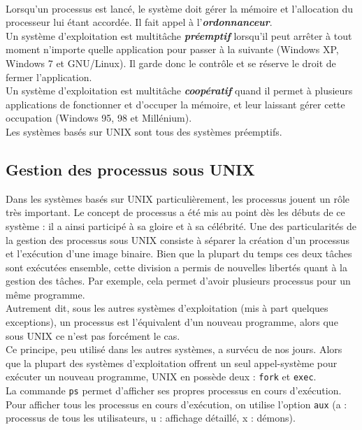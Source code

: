 		\paragraph{}
		Lorsqu'un processus est lancé, le système doit gérer la mémoire et l'allocation du processeur lui étant accordée. Il fait appel à l'\textit{\textbf{ordonnanceur}}.\\
		Un système d'exploitation est multitâche \textbf{\textit{préemptif}} lorsqu'il peut arrêter à tout moment n'importe quelle application pour passer à la suivante (Windows XP, Windows 7 et GNU/Linux). Il garde donc le contrôle et se réserve le droit de fermer l'application.\\
		Un système d'exploitation est multitâche \textbf{\textit{coopératif}} quand il permet à plusieurs applications de fonctionner et d'occuper la mémoire, et leur laissant gérer cette occupation (Windows 95, 98 et Millénium).\\
		Les systèmes basés sur UNIX sont tous des systèmes préemptifs.
		
	\subsection{Gestion des processus sous UNIX}
		Dans les systèmes basés sur UNIX particulièrement, les processus jouent un rôle très important. Le concept de processus a été mis au point dès les débuts de ce système : il a ainsi participé à sa gloire et à sa célébrité. Une des particularités de la gestion des processus sous UNIX consiste à séparer la création d'un processus et l'exécution d'une image binaire. Bien que la plupart du temps ces deux tâches sont exécutées ensemble, cette division a permis de nouvelles libertés quant à la gestion des tâches. Par exemple, cela permet d'avoir plusieurs processus pour un même programme.\\
		
		Autrement dit, sous les autres systèmes d'exploitation (mis à part quelques exceptions), un processus est l'équivalent d'un nouveau programme, alors que sous UNIX ce n'est pas forcément le cas.\\
		Ce principe, peu utilisé dans les autres systèmes, a survécu de nos jours. Alors que la plupart des systèmes d'exploitation offrent un seul appel-système pour exécuter un nouveau programme, UNIX en possède deux : \lstinline!fork! et \lstinline!exec!.\\
		
		La commande \lstinline!ps! permet d'afficher ses propres processus en cours d'exécution. Pour afficher tous les processus en cours d'exécution, on utilise l'option \lstinline!aux! (a : processus de tous les utilisateurs, u : affichage détaillé, x : démons).
		
